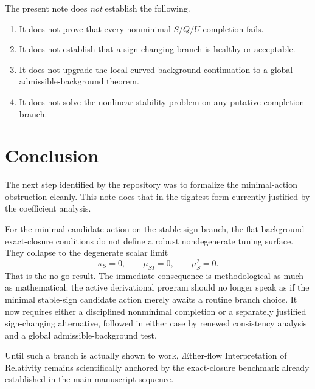 \documentclass[11pt]{article}
\newcommand{\Aflow}{\AE{}ther-flow}
\newcommand{\TheoryName}{\Aflow{} Interpretation of Relativity}
\begin{document}
The present note does \emph{not} establish the following.
\begin{enumerate}
    \item It does not prove that every nonminimal \(S/Q/U\) completion fails.
    \item It does not establish that a sign-changing branch is healthy or acceptable.
    \item It does not upgrade the local curved-background continuation to a global admissible-background theorem.
    \item It does not solve the nonlinear stability problem on any putative completion branch.
\end{enumerate}

\section{Conclusion}

The next step identified by the repository was to formalize the minimal-action obstruction cleanly. This note does that in the tightest form currently justified by the coefficient analysis.

For the minimal candidate action on the stable-sign branch, the flat-background exact-closure conditions do not define a robust nondegenerate tuning surface. They collapse to the degenerate scalar limit
\[
\kappa_S=0,
\qquad
\mu_{SI}=0,
\qquad
\mu_S^2=0.
\]
That is the no-go result. The immediate consequence is methodological as much as mathematical: the active derivational program should no longer speak as if the minimal stable-sign candidate action merely awaits a routine branch choice. It now requires either a disciplined nonminimal completion or a separately justified sign-changing alternative, followed in either case by renewed consistency analysis and a global admissible-background test.

Until such a branch is actually shown to work, \TheoryName{} remains scientifically anchored by the exact-closure benchmark already established in the main manuscript sequence.
\end{document}
